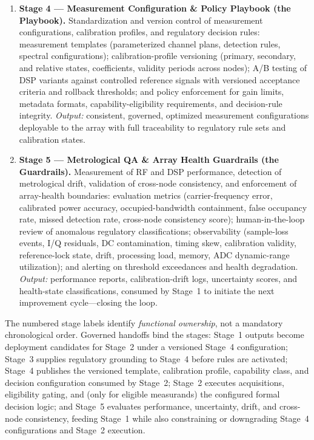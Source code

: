 \documentclass[11pt,a4paper]{article}
\begin{document}
\begin{enumerate}
    array topology, and inter-node calibration histories. \emph{Output:} contextual regulatory
    grounding and versioned measurand-specific decision definitions (rule type, limits or
    permitted region, reference quantities, rule parameters, regulatory source).
  \item \textbf{Stage 4 --- Measurement Configuration \& Policy Playbook (the Playbook).}
    Standardization and version control of measurement configurations, calibration profiles, and
    regulatory decision rules: measurement templates (parameterized channel plans, detection
    rules, spectral configurations); calibration-profile versioning (primary, secondary, and
    relative states, coefficients, validity periods across nodes); A/B testing of DSP variants
    against controlled reference signals with versioned acceptance criteria and rollback
    thresholds; and policy enforcement for gain limits, metadata formats, capability-eligibility
    requirements, and decision-rule integrity. \emph{Output:} consistent, governed, optimized
    measurement configurations deployable to the array with full traceability to regulatory rule
    sets and calibration states.
  \item \textbf{Stage 5 --- Metrological QA \& Array Health Guardrails (the Guardrails).}
    Measurement of RF and DSP performance, detection of metrological drift, validation of
    cross-node consistency, and enforcement of array-health boundaries: evaluation metrics
    (carrier-frequency error, calibrated power accuracy, occupied-bandwidth containment, false
    occupancy rate, missed detection rate, cross-node consistency score); human-in-the-loop
    review of anomalous regulatory classifications; observability (sample-loss events, I/Q
    residuals, DC contamination, timing skew, calibration validity, reference-lock state, drift,
    processing load, memory, ADC dynamic-range utilization); and alerting on threshold
    exceedances and health degradation. \emph{Output:} performance reports, calibration-drift
    logs, uncertainty scores, and health-state classifications, consumed by Stage~1 to initiate
    the next improvement cycle---closing the loop.
\end{enumerate}

The numbered stage labels identify \emph{functional ownership}, not a mandatory chronological
order. Governed handoffs bind the stages: Stage~1 outputs become deployment candidates for
Stage~2 under a versioned Stage~4 configuration; Stage~3 supplies regulatory grounding to Stage~4
before rules are activated; Stage~4 publishes the versioned template, calibration profile,
capability class, and decision configuration consumed by Stage~2; Stage~2 executes acquisitions,
eligibility gating, and (only for eligible measurands) the configured formal decision logic; and
Stage~5 evaluates performance, uncertainty, drift, and cross-node consistency, feeding Stage~1
while also constraining or downgrading Stage~4 configurations and Stage~2 execution.
\end{document}
